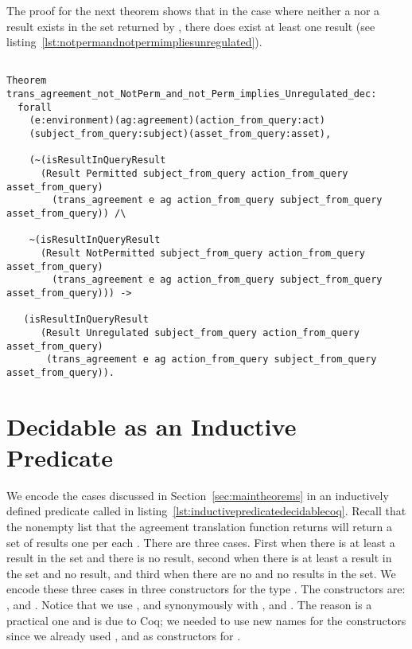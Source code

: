 The proof for the next theorem  shows that in the case where neither a  nor a  result exists in the set returned by , there does exist at least one  result (see listing~\ref{lst:notpermandnotpermimpliesunregulated}).

\begin{minipage}[c]{0.95\textwidth}
\begin{lstlisting}

Theorem trans_agreement_not_NotPerm_and_not_Perm_implies_Unregulated_dec:
  forall
    (e:environment)(ag:agreement)(action_from_query:act)
    (subject_from_query:subject)(asset_from_query:asset),

    (~(isResultInQueryResult 
      (Result Permitted subject_from_query action_from_query asset_from_query)
        (trans_agreement e ag action_from_query subject_from_query asset_from_query)) /\

    ~(isResultInQueryResult 
      (Result NotPermitted subject_from_query action_from_query asset_from_query)
        (trans_agreement e ag action_from_query subject_from_query asset_from_query))) ->

   (isResultInQueryResult 
      (Result Unregulated subject_from_query action_from_query asset_from_query)
       (trans_agreement e ag action_from_query subject_from_query asset_from_query)).
\end{lstlisting}
\end{minipage}


\section{Decidable as an Inductive Predicate}

We encode the cases discussed in Section~\ref{sec:maintheorems} in an inductively defined predicate called  in listing~\ref{lst:inductivepredicatedecidablecoq}. Recall that the nonempty list that the agreement translation function  returns will return a set of results one per each . There are three cases. First when there is at least a  result in the set and there is no  result, second when there is at least a  result in the set and no  result, and third when there are no  and no  results in the set. We encode these three cases in three constructors for the type . The constructors are: ,  and . Notice that we use ,  and  synonymously with ,  and . The reason is a practical one and is due to Coq; we needed to use new names for the  constructors since we already used ,  and  as constructors for . 

